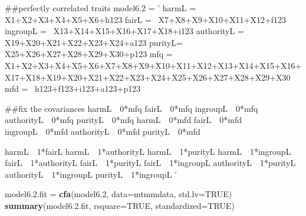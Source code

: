 \documentclass[english,man]{apa6}
\newenvironment{Shaded}{\begin{snugshade}}{\end{snugshade}}
\newcommand{\KeywordTok}[1]{\textcolor[rgb]{0.13,0.29,0.53}{\textbf{#1}}}
\newcommand{\DataTypeTok}[1]{\textcolor[rgb]{0.13,0.29,0.53}{#1}}
\newcommand{\DecValTok}[1]{\textcolor[rgb]{0.00,0.00,0.81}{#1}}
\newcommand{\FloatTok}[1]{\textcolor[rgb]{0.00,0.00,0.81}{#1}}
\newcommand{\StringTok}[1]{\textcolor[rgb]{0.31,0.60,0.02}{#1}}
\newcommand{\OtherTok}[1]{\textcolor[rgb]{0.56,0.35,0.01}{#1}}
\newcommand{\NormalTok}[1]{#1}
\newcounter{author}
\theoremstyle{definition}
\theoremstyle{definition}
\theoremstyle{definition}
\theoremstyle{remark}
\begin{document}
\begin{Shaded}
\begin{Highlighting}[]
\NormalTok{##perfectly correlated traits}
\NormalTok{model6.}\DecValTok{2}\NormalTok{ =}\StringTok{ '}
\StringTok{harmL =~ X1+X2+X3+X4+X5+X6+h123}
\StringTok{fairL =~ X7+X8+X9+X10+X11+X12+f123}
\StringTok{ingroupL =~ X13+X14+X15+X16+X17+X18+i123}
\StringTok{authorityL =~ X19+X20+X21+X22+X23+X24+a123}
\StringTok{purityL=~ X25+X26+X27+X28+X29+X30+p123}
\StringTok{mfq =~ X1+X2+X3+X4+X5+X6+X7+X8+X9+X10+X11+X12+X13+X14+X15+X16+X17+X18+X19+X20+X21+X22+X23+X24+X25+X26+X27+X28+X29+X30}
\StringTok{mfd =~ h123+f123+i123+a123+p123}

\StringTok{##fix the covariances}
\StringTok{harmL~~0*mfq}
\StringTok{fairL~~0*mfq}
\StringTok{ingroupL~~0*mfq}
\StringTok{authorityL~~0*mfq}
\StringTok{purityL~~0*mfq}
\StringTok{harmL~~0*mfd}
\StringTok{fairL~~0*mfd}
\StringTok{ingroupL~~0*mfd}
\StringTok{authorityL~~0*mfd}
\StringTok{purityL~~0*mfd}

\StringTok{harmL~~1*fairL}
\StringTok{harmL~~1*authorityL}
\StringTok{harmL~~1*purityL}
\StringTok{harmL~~1*ingroupL}
\StringTok{fairL~~1*authorityL}
\StringTok{fairL~~1*purityL}
\StringTok{fairL~~1*ingroupL}
\StringTok{authorityL~~1*purityL}
\StringTok{authorityL~~1*ingroupL}
\StringTok{purityL~~1*ingroupL}
\StringTok{'}

\NormalTok{model6.}\FloatTok{2.}\NormalTok{fit =}\StringTok{ }\KeywordTok{cfa}\NormalTok{(model6.}\DecValTok{2}\NormalTok{, }\DataTypeTok{data=}\NormalTok{mtmmdata, }\DataTypeTok{std.lv=}\OtherTok{TRUE}\NormalTok{)}
\KeywordTok{summary}\NormalTok{(model6.}\FloatTok{2.}\NormalTok{fit, }\DataTypeTok{rsquare=}\OtherTok{TRUE}\NormalTok{, }\DataTypeTok{standardized=}\OtherTok{TRUE}\NormalTok{)}
\end{Highlighting}
\end{Shaded}
\end{document}
